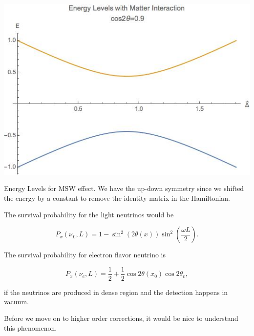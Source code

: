 \documentclass{tufte-handout}
\begin{document}
\begin{marginfigure}
\includegraphics{assets/mswEnergyLevels}
\caption{Energy Levels for MSW effect. We have the up-down symmetry since we shifted the energy by a constant to remove the identity matrix in the Hamiltonian.}
\end{marginfigure}


The survival probability for the light neutrinos would be

\begin{equation*}
P_x(\nu_L,L) = 1 - \sin^2(2\theta (x))\sin^2\left( \frac{\omega L}{2} \right) .
\end{equation*}


The survival probability for electron flavor neutrino is

\begin{equation*}
P_x(\nu_e,L) = \frac{1}{2} + \frac{1}{2}\cos 2\theta(x_0) \cos 2\theta_v,
\end{equation*}

if the neutrinos are produced in dense region and the detection happens in vacuum.


Before we move on to higher order corrections, it would be nice to understand this phenomenon.
\end{document}
